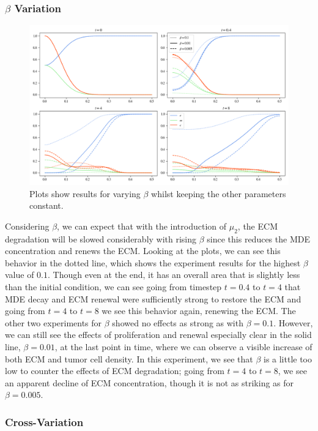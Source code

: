 \subsubsection*{$\beta$ Variation}
\begin{figure}[h!]
    \centering
    \includegraphics[width=\textwidth]{resources/images/prolif_beta_variation.png}
    \caption{Plots show results for varying $\beta$ whilst keeping the other parameters constant.}
    \label{fig:prolif_beta_variation}
\end{figure}

Considering $\beta$, we can expect that with the introduction of $\mu_2$, the ECM degradation will be slowed considerably with rising $\beta$ since this reduces the MDE concentration and renews the ECM. Looking at the plots, we can see this behavior in the dotted line, which shows the experiment results for the highest $\beta$ value of $0.1$. Though even at the end, it has an overall area that is slightly less than the initial condition, we can see going from timestep $t=0.4$ to $t=4$ that MDE decay and ECM renewal were sufficiently strong to restore the ECM and going from $t=4$ to $t=8$ we see this behavior again, renewing the ECM. The other two experiments for $\beta$ showed no effects as strong as with $\beta=0.1$. However, we can still see the effects of proliferation and renewal especially clear in the solid line, $\beta=0.01$, at the last point in time, where we can observe a visible increase of both ECM and tumor cell density. In this experiment, we see that $\beta$ is a little too low to counter the effects of ECM degradation; going from $t=4$ to $t=8$, we see an apparent decline of ECM concentration, though it is not as striking as for $\beta=0.005$. 

\subsubsection*{Cross-Variation}

